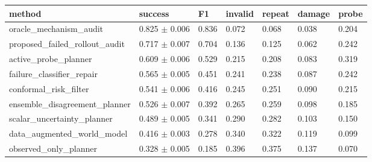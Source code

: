 \begin{tabular}{lllllll}
\toprule
method & success & F1 & invalid & repeat & damage & probe \\
\midrule
oracle\_mechanism\_audit & 0.825 $\pm$ 0.006 & 0.836 & 0.072 & 0.068 & 0.038 & 0.204 \\
proposed\_failed\_rollout\_audit & 0.717 $\pm$ 0.007 & 0.704 & 0.136 & 0.125 & 0.062 & 0.242 \\
active\_probe\_planner & 0.609 $\pm$ 0.006 & 0.529 & 0.215 & 0.208 & 0.083 & 0.319 \\
failure\_classifier\_repair & 0.565 $\pm$ 0.005 & 0.451 & 0.241 & 0.238 & 0.087 & 0.242 \\
conformal\_risk\_filter & 0.541 $\pm$ 0.006 & 0.416 & 0.245 & 0.251 & 0.090 & 0.215 \\
ensemble\_disagreement\_planner & 0.526 $\pm$ 0.007 & 0.392 & 0.265 & 0.259 & 0.098 & 0.185 \\
scalar\_uncertainty\_planner & 0.489 $\pm$ 0.005 & 0.341 & 0.290 & 0.282 & 0.103 & 0.150 \\
data\_augmented\_world\_model & 0.416 $\pm$ 0.003 & 0.278 & 0.340 & 0.322 & 0.119 & 0.099 \\
observed\_only\_planner & 0.328 $\pm$ 0.005 & 0.185 & 0.396 & 0.375 & 0.137 & 0.070 \\
\bottomrule
\end{tabular}
